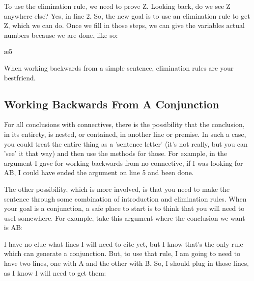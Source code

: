 To use the elimination rule, we need to prove Z. Looking back, do we see Z anywhere else? Yes, in line 2. So, the new goal is to use an elimination rule to get Z, which we can do. Once we fill in those steps, we can give the variables actual numbers because we are done, like so: 
\begin{fitchproof}
\ae{5}
\end{fitchproof}

When working backwards from a simple sentence, elimination rules are your bestfriend. 

\subsection{Working Backwards From A Conjunction}

For all conclusions with connectives, there is the possibility that the conclusion, in its entirety, is nested, or contained, in another line or premise. In such a case, you could treat the entire thing as a 'sentence letter' (it's not really, but you can 'see' it that way) and then use the methods for those. For example, in the argument I gave for working backwards from no connective, if I was looking for A\eand B, I could have ended the argument on line 5 and been done. 

The other possibility, which is more involved, is that you need to make the sentence through some combination of introduction and elimination rules. When your goal is a conjunction, a safe place to start is to think that you will need to use\eand I somewhere. For example, take this argument where the conclusion we want is A\eand B:
\begin{fitchproof}
\ellipsesline
{}\ai{}
\end{fitchproof}

I have no clue what lines I will need to cite yet, but I know that's the only rule which can generate a conjunction. But, to use that rule, I am going to need to have two lines, one with A and the other with B. So, I should plug in those lines, as I know I will need to get them:
\begin{fitchproof}
\ellipsesline
{}
\end{fitchproof}

